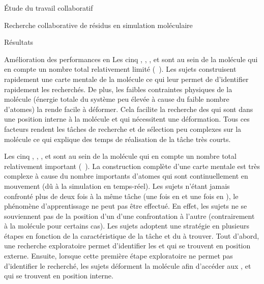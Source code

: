 \documentclass[myfrancais]{mythesis}
\begin{document}
\begin{mypart}{Étude du travail collaboratif}
\begin{mychapter}{Recherche collaborative de résidus en simulation moléculaire}
\begin{mysection}{Résultats}
\begin{mysubsection}{Amélioration des performances en }
					Les cinq  , , ,  et  sont au sein de la molécule \myTRPCAGE qui en compte un nombre total relativement limité (~).
					Les sujets construisent rapidement une carte mentale de la molécule ce qui leur permet de d'identifier rapidement les  recherchés.
					De plus, les faibles contraintes physiques de la molécule (énergie totale du système peu élevée à cause du faible nombre d'atomes) la rende facile à déformer.
					Cela facilite la recherche des  qui sont dans une position interne à la molécule et qui nécessitent une déformation.
					Tous ces facteurs rendent les tâches de recherche et de sélection peu complexes sur la molécule \myTRPCAGE ce qui explique des temps de réalisation de la tâche très courts.

					Les cinq  , , ,  et  sont au sein de la molécule \myPrion qui en compte un nombre total relativement important (~).
					La construction complète d'une carte mentale est très complexe à cause du nombre importants d'atomes qui sont continuellement en mouvement (dû à la simulation en temps-réel).
					Les sujets n'étant jamais confronté plus de deux fois à la même tâche (une fois en  et une fois en ), le phénomène d'apprentissage ne peut pas être effectué.
					En effet, les sujets ne se souviennent pas de la position d'un  d'une confrontation à l'autre (contrairement à la molécule \myTRPCAGE pour certains cas).
					Les sujets adoptent une stratégie en plusieurs étapes en fonction de la caractéristique de la tâche et du  à trouver.
					Tout d'abord, une recherche exploratoire permet d'identifier les   et  qui se trouvent en position externe.
					Ensuite, lorsque cette première étape exploratoire ne permet pas d'identifier le  recherché, les sujets déforment la molécule afin d'accéder aux  ,  et  qui se trouvent en position interne.


\end{mysubsection}
\end{mysection}
\end{mychapter}
\end{mypart}
\end{document}
